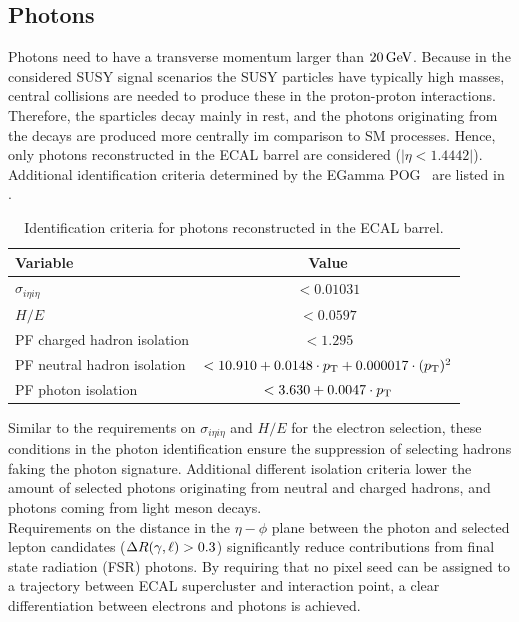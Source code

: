 \subsection{Photons}
Photons need to have a transverse momentum larger than $20\,\text{Ge\hspace{-.08em}V}$.  Because in the considered SUSY signal scenarios the SUSY particles have typically high masses, central collisions are needed to produce these in the proton-proton interactions.  Therefore, the sparticles decay mainly in rest, and the photons originating from the decays are produced more centrally im comparison to SM processes. Hence, only photons reconstructed in the ECAL barrel are considered ($|\eta<1.4442|$). Additional identification criteria determined by the EGamma POG~\cite{photonID} are listed in .
\begin{table}[h!]
 \centering
 \caption{Identification criteria for photons reconstructed in the ECAL barrel.}
 \label{tab:photonID}
 \begin{tabular}{lc}
  Variable                    & Value                                                \\\hline
  $\sigma_{i\eta i\eta}$      & $<0.01031$                                           \\
  $H/E$                       & $<0.0597$                                            \\
  PF charged hadron isolation & $<1.295$                                             \\
  PF neutral hadron isolation & $<10.910 + 0.0148 \cdot p_{\mathrm{T}} + 0.000017\cdot (p_{\mathrm{T}})^2$ \\
  PF photon isolation         & $<3.630+0.0047\cdot p_{\mathrm{T}}$                             \\\hline
 \end{tabular}
\end{table}
Similar to the requirements on $\sigma_{i\eta i\eta}$ and $H/E$ for the electron selection, these conditions in the photon identification ensure the suppression of selecting hadrons faking the photon signature. Additional different isolation criteria lower the amount of selected photons originating from neutral and charged hadrons, and photons coming from light meson decays.\\
Requirements on the distance in the $\eta-\phi$ plane between the photon and selected lepton candidates ($\Delta R(\gamma,\ell)>0.3$) significantly reduce contributions from final state radiation (FSR) photons. By requiring that no pixel seed can be assigned to a trajectory between ECAL supercluster and interaction point, a clear differentiation between electrons and photons is achieved.

